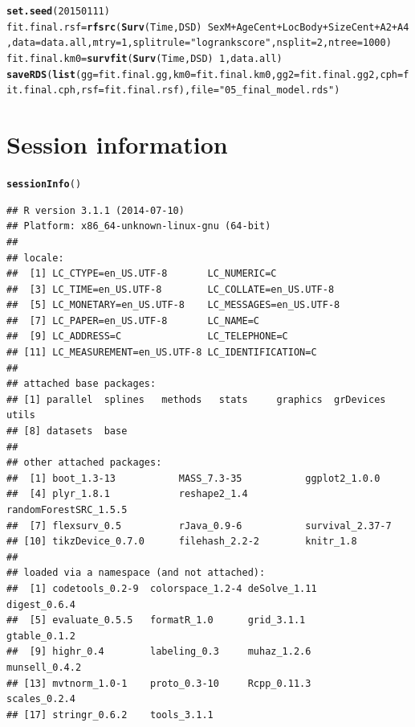 \documentclass{article}\usepackage[]{graphicx}\usepackage[]{color}
\makeatletter
\newcommand{\hlnum}[1]{\textcolor[rgb]{0.686,0.059,0.569}{#1}}%
\newcommand{\hlstr}[1]{\textcolor[rgb]{0.192,0.494,0.8}{#1}}%
\newcommand{\hlopt}[1]{\textcolor[rgb]{0,0,0}{#1}}%
\newcommand{\hlstd}[1]{\textcolor[rgb]{0.345,0.345,0.345}{#1}}%
\newcommand{\hlkwb}[1]{\textcolor[rgb]{0.69,0.353,0.396}{#1}}%
\newcommand{\hlkwc}[1]{\textcolor[rgb]{0.333,0.667,0.333}{#1}}%
\newcommand{\hlkwd}[1]{\textcolor[rgb]{0.737,0.353,0.396}{\textbf{#1}}}%
\newenvironment{kframe}{%
 \def\at@end@of@kframe{}%
 \ifinner\ifhmode%
  \def\at@end@of@kframe{\end{minipage}}%
  \begin{minipage}{\columnwidth}%
 \fi\fi%
 \def\FrameCommand##1{\hskip\@totalleftmargin \hskip-\fboxsep
 \colorbox{shadecolor}{##1}\hskip-\fboxsep
     \hskip-\linewidth \hskip-\@totalleftmargin \hskip\columnwidth}%
 \MakeFramed {\advance\hsize-\width
   \@totalleftmargin\z@ \linewidth\hsize
   \@setminipage}}%
 {\par\unskip\endMakeFramed%
 \at@end@of@kframe}
\newenvironment{knitrout}{}{} %
\makeatother
\begin{document}
\begin{knitrout}
\begin{kframe}
\begin{alltt}
\hlkwd{set.seed}\hlstd{(}\hlnum{20150111}\hlstd{)}
\hlstd{fit.final.rsf} \hlkwb{=} \hlkwd{rfsrc}\hlstd{(}\hlkwd{Surv}\hlstd{(Time, DSD)} \hlopt{~} \hlstd{SexM} \hlopt{+} \hlstd{AgeCent} \hlopt{+} \hlstd{LocBody} \hlopt{+} \hlstd{SizeCent} \hlopt{+} \hlstd{A2} \hlopt{+} \hlstd{A4,} \hlkwc{data} \hlstd{= data.all,} \hlkwc{mtry} \hlstd{=} \hlnum{1}\hlstd{,} \hlkwc{splitrule} \hlstd{=} \hlstr{"logrankscore"}\hlstd{,} \hlkwc{nsplit} \hlstd{=} \hlnum{2}\hlstd{,} \hlkwc{ntree} \hlstd{=} \hlnum{1000}\hlstd{)}
\hlstd{fit.final.km0} \hlkwb{=} \hlkwd{survfit}\hlstd{(}\hlkwd{Surv}\hlstd{(Time, DSD)} \hlopt{~} \hlnum{1}\hlstd{, data.all)}
\hlkwd{saveRDS}\hlstd{(}\hlkwd{list}\hlstd{(}\hlkwc{gg} \hlstd{= fit.final.gg,} \hlkwc{km0} \hlstd{= fit.final.km0,} \hlkwc{gg2} \hlstd{= fit.final.gg2,} \hlkwc{cph} \hlstd{= fit.final.cph,} \hlkwc{rsf} \hlstd{= fit.final.rsf),} \hlkwc{file} \hlstd{=} \hlstr{"05_final_model.rds"}\hlstd{)}
\end{alltt}
\end{kframe}
\end{knitrout}

\section{Session information}
\begin{knitrout}
\color{fgcolor}\begin{kframe}
\begin{alltt}
\hlkwd{sessionInfo}\hlstd{()}
\end{alltt}
\begin{verbatim}
## R version 3.1.1 (2014-07-10)
## Platform: x86_64-unknown-linux-gnu (64-bit)
## 
## locale:
##  [1] LC_CTYPE=en_US.UTF-8       LC_NUMERIC=C              
##  [3] LC_TIME=en_US.UTF-8        LC_COLLATE=en_US.UTF-8    
##  [5] LC_MONETARY=en_US.UTF-8    LC_MESSAGES=en_US.UTF-8   
##  [7] LC_PAPER=en_US.UTF-8       LC_NAME=C                 
##  [9] LC_ADDRESS=C               LC_TELEPHONE=C            
## [11] LC_MEASUREMENT=en_US.UTF-8 LC_IDENTIFICATION=C       
## 
## attached base packages:
## [1] parallel  splines   methods   stats     graphics  grDevices utils    
## [8] datasets  base     
## 
## other attached packages:
##  [1] boot_1.3-13           MASS_7.3-35           ggplot2_1.0.0        
##  [4] plyr_1.8.1            reshape2_1.4          randomForestSRC_1.5.5
##  [7] flexsurv_0.5          rJava_0.9-6           survival_2.37-7      
## [10] tikzDevice_0.7.0      filehash_2.2-2        knitr_1.8            
## 
## loaded via a namespace (and not attached):
##  [1] codetools_0.2-9  colorspace_1.2-4 deSolve_1.11     digest_0.6.4    
##  [5] evaluate_0.5.5   formatR_1.0      grid_3.1.1       gtable_0.1.2    
##  [9] highr_0.4        labeling_0.3     muhaz_1.2.6      munsell_0.4.2   
## [13] mvtnorm_1.0-1    proto_0.3-10     Rcpp_0.11.3      scales_0.2.4    
## [17] stringr_0.6.2    tools_3.1.1
\end{verbatim}
\end{kframe}
\end{knitrout}
\end{document}
